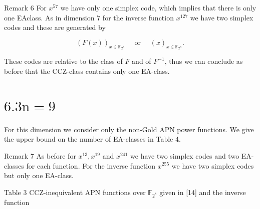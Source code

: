 \documentclass[10pt]{article}
\begin{document}
Remark 6 For $x^{57}$ we have only one simplex code, which implies that there is only one EAclass. As in dimension 7 for the inverse function $x^{127}$ we have two simplex codes and these are generated by

$$
(F(x))_{x \in \mathbb{F}_{2^{n}}} \quad \text { or } \quad(x)_{x \in \mathbb{F}_{2^{n}}} .
$$

These codes are relative to the class of $F$ and of $F^{-1}$, thus we can conclude as before that the CCZ-class contains only one EA-class.

\section*{$6.3 \mathrm{n}=9$}
For this dimension we consider only the non-Gold APN power functions. We give the upper bound on the number of EA-classes in Table 4.

Remark 7 As before for $x^{13}, x^{19}$ and $x^{241}$ we have two simplex codes and two EA-classes for each function. For the inverse function $x^{255}$ we have two simplex codes but only one EA-class.

Table 3 CCZ-inequivalent APN functions over $\mathbb{F}_{2^{8}}$ given in [14] and the inverse function
\end{document}
